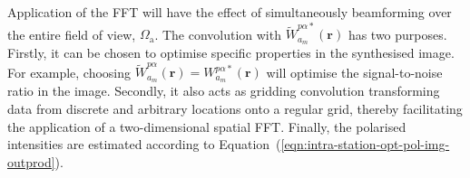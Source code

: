 \documentclass[
  journal=pasa,
  manuscript=article-type,
  year=2020,
  volume=37,
]{cup-journal}
\begin{document}
Application of the FFT will have the effect of simultaneously beamforming over the entire field of view, $\Omega_\textrm{a}$. The convolution with $\widetilde{W}_{a_m}^{p\alpha*}(\boldsymbol{r})$ has two purposes. Firstly, it can be chosen to optimise specific properties in the synthesised image. For example, choosing $\widetilde{W}_{a_m}^{p\alpha}(\boldsymbol{r})=W_{a_m}^{p\alpha*}(\boldsymbol{r})$ will optimise the signal-to-noise ratio in the image. Secondly, it also acts as gridding convolution transforming data from discrete and arbitrary locations onto a regular grid, thereby facilitating the application of a two-dimensional spatial FFT. Finally, the polarised intensities are estimated according to Equation~(\ref{eqn:intra-station-opt-pol-img-outprod}).

\end{document}

